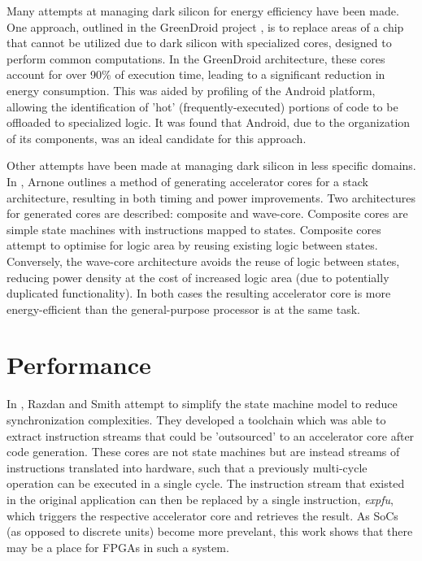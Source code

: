 \documentclass{report}
\begin{document}
Many attempts at managing dark silicon for energy efficiency have been made. One approach, outlined in the GreenDroid project
\cite{greendroid}, is to replace areas of a chip that cannot be utilized due to dark silicon with specialized cores, designed
to perform common computations. In the GreenDroid architecture, these cores account for over 90\% of execution time,
leading to a significant reduction in energy consumption. This was aided by profiling of the Android platform, allowing the
identification of 'hot' (frequently-executed) portions of code to be offloaded to specialized logic. It was found that Android,
due to the organization of its components, was an ideal candidate for this approach.

Other attempts have been made at managing dark silicon in less specific domains. In \cite{arnone-thesis}, Arnone outlines a
method of generating accelerator cores for a stack architecture, resulting in both timing and power improvements. Two architectures
for generated cores are described: composite and wave-core. Composite cores are simple state machines with instructions mapped to
states. Composite cores attempt to optimise for logic area by reusing existing logic between states. Conversely, the wave-core
architecture avoids the reuse of logic between states, reducing power density at the cost of increased logic area (due to
potentially duplicated functionality). In both cases the resulting accelerator core is more energy-efficient than the
general-purpose processor is at the same task.

\section{Performance}

In \cite{high-performance-microarchitecture}, Razdan and Smith attempt to simplify the state machine model to reduce
synchronization complexities. They developed a toolchain which was able to extract instruction streams that could be 'outsourced'
to an accelerator core after code generation. These cores are not state machines but are instead streams of instructions translated into hardware, such that a previously multi-cycle operation can be executed in a single cycle. The instruction
stream that existed in the original application can then be replaced by a single instruction, \textit{expfu}, which triggers
the respective accelerator core and retrieves the result. As SoCs (as opposed to discrete units) become more prevelant,
this work shows that there may be a place for FPGAs in such a system.
\end{document}
